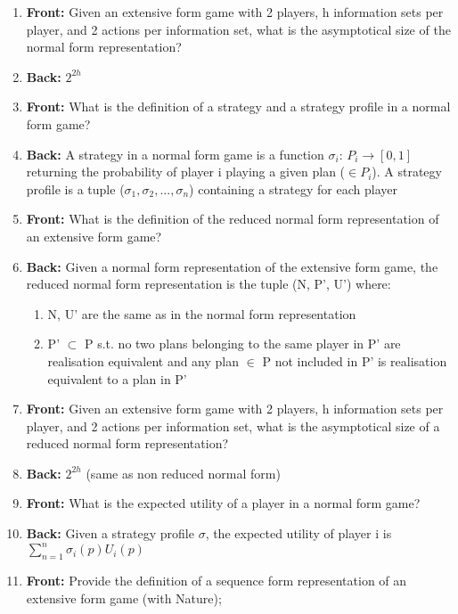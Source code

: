 \documentclass{article}
\begin{document}
\begin{enumerate}
\begin{itemize}
    \end{itemize}\newpage
    \item \textbf{Front:} Given an extensive form game with 2 players, h information sets per player, and 2 actions per information set, what is the asymptotical size of the normal form representation?\newpage
    \item \textbf{Back:} $2^{2h}$\newpage
    \item \textbf{Front:} What is the definition of a strategy and a strategy profile in a normal form game?\newpage
    \item \textbf{Back:} A strategy in a normal form game is a function $\sigma_i$: $P_i \rightarrow [0,1]$ returning the probability of player i playing a given plan ($\in P_i$).\newline
    A strategy profile is a tuple ($\sigma_1, \sigma_2, ..., \sigma_n$) containing a strategy for each player\newpage
    \item \textbf{Front:} What is the definition of the reduced normal form representation of an extensive form game?\newpage
    \item \textbf{Back:} Given a normal form representation of the extensive form game, the reduced normal form representation is the tuple (N, P', U') where:
    \begin{enumerate}
        \item N, U' are the same as in the normal form representation
        \item P' $\subset$ P s.t. no two plans belonging to the same player in P' are realisation equivalent and any plan $\in$ P not included in P' is realisation equivalent to a plan in P' 
    \end{enumerate}\newpage
    \item \textbf{Front:} Given an extensive form game with 2 players, h information sets per player, and 2 actions per information set, what is the asymptotical size of a reduced normal form representation? \newpage
    \item \textbf{Back:} $2^{2h}$ (same as non reduced normal form)\
    \item \textbf{Front:} What is the expected utility of a player in a normal form game?\newpage
    \item \textbf{Back:} Given a strategy profile \textbf{$\sigma$}, the expected utility of player i is $\sum_{n = 1}^{n} \sigma_i(p)U_i(p)$\newpage
    \item \textbf{Front:} Provide the definition of a sequence form representation of an extensive form game (with Nature);\newpage

\end{enumerate}
\end{document}
